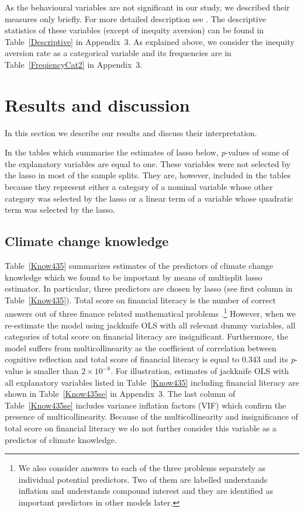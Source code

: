 \documentclass[a4paper,12pt]{article}
\begin{document}
As the behavioural variables are not significant in our study, we described their measures only briefly. For more detailed description see \citet{SurveyUK}. The descriptive statistics of these variables (except of inequity aversion) can be found in Table~\ref{Descriptive} in Appendix~$3$. As explained above, we consider the inequity aversion rate as a categorical variable and its frequencies are in Table~\ref{FreqiencyCat2} in Appendix~$3$.




\FloatBarrier
	\section{Results and discussion}\label{Results}
In this section we describe our results and discuss their interpretation.

In the tables which summarise the estimates of lasso below, \textit{p}-values of some of the explanatory variables are equal to one. These variables were not selected by the lasso in most of the sample splits. They are, however, included in the tables because they represent either a category of a nominal variable whose other category was selected by the lasso or a linear term of a variable whose quadratic term was selected by the lasso. 

\subsection{Climate change knowledge}\label{ResKnow}

Table~\ref{Know435} summarizes estimates of the predictors of climate change knowledge which we found to be important by means of multisplit lasso estimator. In particular, three predictors are chosen by lasso (see first column in Table~\ref{Know435}). Total score on financial literacy is the number of correct answers out of three finance related mathematical problems \citep{SurveyUK}.\footnote{We also consider answers to each of the three problems separately as individual potential predictors. Two of them are labelled understands inflation and understands compound interest and they are identified as important predictors in other models later.} However, when we re-estimate the model using jackknife OLS with all relevant dummy variables, all categories of total score on financial literacy are insignificant. Furthermore, the model suffers from multicollinearity as the coefficient of correlation between cognitive reflection and total score of financial literacy is equal to $0.343$ and its \textit{p}-value is smaller than $2\times10^{-8}$. For illustration, estimates of jackknife OLS with all explanatory variables listed in Table~\ref{Know435} including financial literacy are shown in Table~\ref{Know435se} in Appendix~$3$. The last column of Table~\ref{Know435se} includes variance inflation factors (VIF) which confirm the presence of multicollinearity. Because of the multicollinearity and insignificance of total score on financial literacy we do not further consider this variable as a predictor of climate knowledge. 
\end{document}
